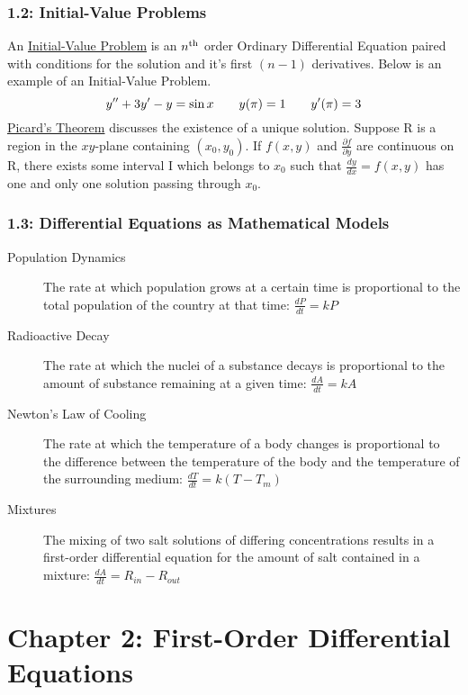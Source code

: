 \documentclass{article}
\begin{document}
\section*{1.2: Initial-Value Problems}
An \underline{Initial-Value Problem} is an \(n^{\textnormal{th}}\) order Ordinary Differential Equation paired with conditions for the solution and it's first \((n-1)\) derivatives. Below is an example of an Initial-Value Problem.
\[y''+3y'-y=\sin x\hspace{7 mm}y(\pi)=1\hspace{7 mm}y'(\pi)=3\]
\underline{Picard's Theorem} discusses the existence of a unique solution. Suppose R is a region in the \(xy\)-plane containing \((x_0,y_0)\). If \(f(x,y)\) and \(\frac{\partial f}{\partial y}\) are continuous on R, there exists some interval I which belongs to \(x_0\) such that \(\frac{dy}{dx}=f(x,y)\) has one and only one solution passing through \(x_0\).
\section*{1.3: Differential Equations as Mathematical Models}
\begin{description}
    \item [Population Dynamics] The rate at which population grows at a certain time is proportional to the total population of the country at that time: \(\frac{dP}{dt}=kP\)
    \item [Radioactive Decay] The rate at which the nuclei of a substance decays is proportional to the amount of substance remaining at a given time: \(\frac{dA}{dt}=kA\)
    \item [Newton's Law of Cooling] The rate at which the temperature of a body changes is proportional to the difference between the temperature of the body and the temperature of the surrounding medium: \(\frac{dT}{dt}=k(T-T_m)\)
    \item [Mixtures] The mixing of two salt solutions of differing concentrations results in a first-order differential equation for the amount of salt contained in a mixture: \(\frac{dA}{dt}=R_{in}-R_{out}\)
\end{description}
\part*{Chapter 2: First-Order Differential Equations}
\end{document}
